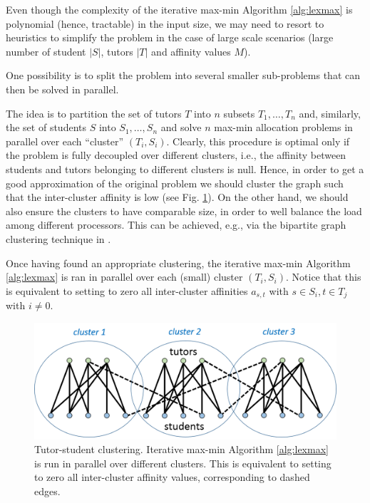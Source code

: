 \documentclass[11pt,oneside,a4paper]{article}     %
\begin{document}
Even though the complexity of the iterative max-min Algorithm \ref{alg:lexmax} is polynomial (hence, tractable) in the input size, we may need to resort to heuristics to simplify the problem in the case of large scale scenarios (large number of student $|S|$, tutors $|T|$ and affinity values $M$). 

One possibility is to split the problem into several smaller sub-problems that can then be solved in parallel.

 The idea is to partition the set of tutors $T$ into $n$ subsets $T_1,\dots,T_n$ and, similarly, the set of students $S$ into $S_1,\dots,S_n$ and solve $n$ max-min allocation problems in parallel over each ``cluster'' $(T_i,S_i)$. Clearly, this procedure is optimal only if the problem is fully decoupled over different clusters, i.e., the affinity between students and tutors belonging to different clusters is null. Hence, in order to get a good approximation of the original problem we should cluster the graph such that the inter-cluster affinity is low (see Fig. \ref{fig:clusters}). On the other hand, we should also ensure the clusters to have comparable size, in order to well balance the load among different processors.
This can be achieved, e.g., via the bipartite graph clustering technique in \cite{zha2001bipartite}.

Once having found an appropriate clustering, the iterative max-min Algorithm \ref{alg:lexmax} is ran in parallel over each (small) cluster $(T_i,S_i)$. Notice that this is equivalent to setting to zero all inter-cluster affinities $a_{s,t}$ with $s\in S_i,t\in T_j$ with $i\ne 0$. 

\begin{figure}
\centering
\includegraphics[scale=.5]{figs/clusters.png}
\caption{Tutor-student clustering. Iterative max-min Algorithm \ref{alg:lexmax} is run in parallel over different clusters. This is equivalent to setting to zero all inter-cluster affinity values, corresponding to dashed edges.}
\label{fig:clusters}
\end{figure}
\end{document}
